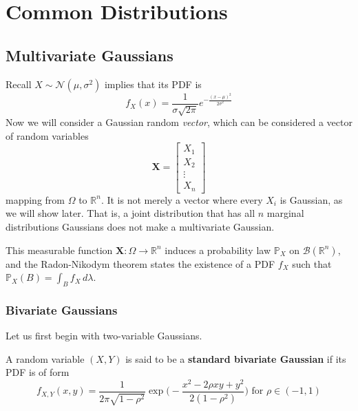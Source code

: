 \documentclass{article}
\begin{document}
\section{Common Distributions}

  \subsection{Multivariate Gaussians}

  Recall $X \sim \mathcal{N}(\mu, \sigma^2)$ implies that its PDF is 
  \[f_X (x) = \frac{1}{\sigma \sqrt{2 \pi}} e^{-\frac{(x - \mu)^2}{2 \sigma^2}}\]
  Now we will consider a Gaussian random \textit{vector}, which can be considered a vector of random variables  
  \[\mathbf{X} = \begin{bmatrix} X_1 \\ X_2 \\ \vdots \\ X_n \end{bmatrix}\]
  mapping from $\Omega$ to $\mathbb{R}^n$. It is not merely a vector where every $X_i$ is Gaussian, as we will show later. That is, a joint distribution that has all $n$ marginal distributions Gaussians does not make a multivariate Gaussian. 

  This measurable function $\mathbf{X}: \Omega \rightarrow \mathbb{R}^n$ induces a probability law $\mathbb{P}_X$ on $\mathcal{B}(\mathbb{R}^n)$, and the Radon-Nikodym theorem states the existence of a PDF $f_X$ such that $\mathbb{P}_X (B) = \int_B f_X \,d\lambda$.

  \subsubsection{Bivariate Gaussians}
  Let us first begin with two-variable Gaussians. 

  \begin{definition}
  A random variable $(X, Y)$ is said to be a \textbf{standard bivariate Gaussian} if its PDF is of form
  \[f_{X, Y} (x, y) = \frac{1}{2 \pi \sqrt{1 - \rho^2}} \exp \bigg( -\frac{x^2 - 2 \rho x y + y^2}{2 (1 - \rho^2)} \bigg) \text{ for } \rho \in (-1, 1)\] 
  \end{definition}
\end{document}
